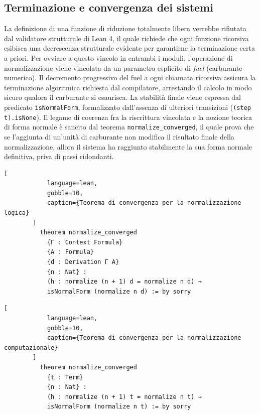 \subsection{Terminazione e convergenza dei sistemi}
La definizione di una funzione di riduzione totalmente libera verrebbe rifiutata dal validatore strutturale di Lean 4, il quale richiede che ogni funzione ricorsiva esibisca una decrescenza strutturale evidente per garantirne la terminazione certa a priori. 
Per ovviare a questo vincolo in entrambi i moduli, l'operazione di normalizzazione viene vincolata da un parametro esplicito di \emph{fuel} (carburante numerico). Il decremento progressivo del fuel a ogni chiamata ricorsiva assicura la terminazione algoritmica 
richiesta dal compilatore, arrestando il calcolo in modo sicuro qualora il carburante si esaurisca. La stabilità finale viene espressa dal predicato \texttt{isNormalForm}, formalizzato dall'assenza di ulteriori transizioni (\texttt{(step t).isNone}). Il legame 
di coerenza fra la riscrittura vincolata e la nozione teorica di forma normale è sancito dal teorema \texttt{normalize\_converged}, il quale prova che se l'aggiunta di un'unità di carburante non modifica il risultato finale della normalizzazione, allora il sistema 
ha raggiunto stabilmente la sua forma normale definitiva, priva di passi ridondanti.
\begin{center}
    \begin{minipage}{\textwidth}
        \begin{lstlisting}[
            language=lean, 
            gobble=10,
            caption={Teorema di convergenza per la normalizzazione logica}
        ]
          theorem normalize_converged 
            {Γ : Context Formula} 
            {A : Formula} 
            {d : Derivation Γ A} 
            {n : Nat} :
            (h : normalize (n + 1) d = normalize n d) → 
            isNormalForm (normalize n d) := by sorry
        \end{lstlisting}
    \end{minipage}
\end{center}
\begin{center}
    \begin{minipage}{\textwidth}
        \begin{lstlisting}[
            language=lean, 
            gobble=10,
            caption={Teorema di convergenza per la normalizzazione computazionale}
        ]
          theorem normalize_converged 
            {t : Term} 
            {n : Nat} :
            (h : normalize (n + 1) t = normalize n t) → 
            isNormalForm (normalize n t) := by sorry
        \end{lstlisting}
    \end{minipage}
\end{center}

